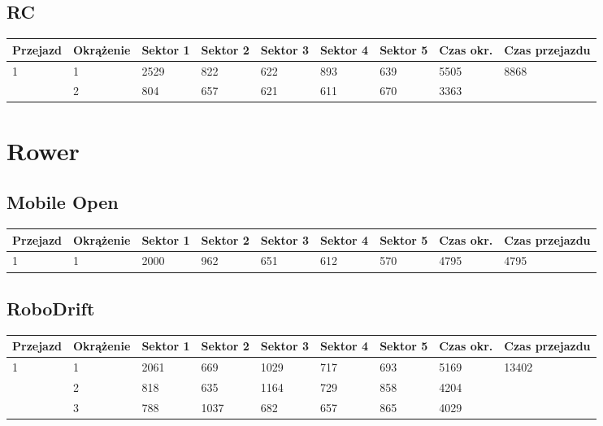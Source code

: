 \documentclass[11pt]{article}
\begin{document}
\subsection{RC}
\begin{table}[h]
\begin{tabular}{|l|l|l|l|l|l|l|l|l|}
\hline
 Przejazd        & Okrążenie & Sektor 1 & Sektor 2 & Sektor 3 & Sektor 4 & Sektor 5 & Czas okr. & Czas przejazdu    \\ \hline
\multirow{2}{*}{1}& 1 &2529& 822& 622& 893& 639& 5505& \multirow{2}{*}{8868} \\ \cline{2-8}
& 2& 804& 657& 621& 611& 670& 3363& \\ \hline
\end{tabular}
\end{table}
\pagebreak
\section{Rower}
\subsection{Mobile Open}
\begin{table}[h]
\begin{tabular}{|l|l|l|l|l|l|l|l|l|}
\hline
   Przejazd        & Okrążenie & Sektor 1 & Sektor 2 & Sektor 3 & Sektor 4 & Sektor 5 & Czas okr. & Czas przejazdu    \\ \hline
\multirow{1}{*}{1}& 1 &2000& 962& 651& 612& 570& 4795& 4795\\ \hline
\end{tabular}
\end{table}
\subsection{RoboDrift}
\begin{table}[h]
\begin{tabular}{|l|l|l|l|l|l|l|l|l|}
\hline
   Przejazd        & Okrążenie & Sektor 1 & Sektor 2 & Sektor 3 & Sektor 4 & Sektor 5 & Czas okr. & Czas przejazdu    \\ \hline
\multirow{3}{*}{1}& 1 &2061& 669& 1029& 717& 693& 5169& \multirow{3}{*}{13402} \\ \cline{2-8}
& 2& 818& 635& 1164& 729& 858& 4204& \\ \cline{2-8}
& 3& 788& 1037& 682& 657& 865& 4029& \\ \hline
\end{tabular}
\end{table}
\end{document}
